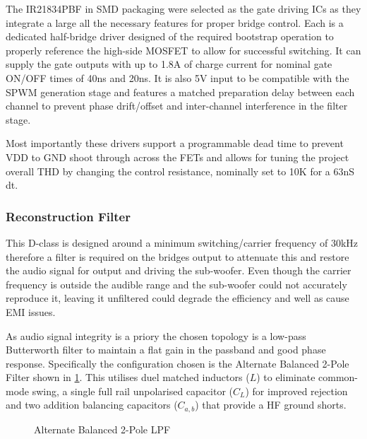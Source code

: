 \documentclass[11pt]{article}
\begin{document}
{The IR21834PBF in SMD packaging were selected as the gate driving ICs as they integrate a large all the necessary features for proper bridge control. Each is a dedicated half-bridge driver designed of the required bootstrap operation to properly reference the high-side MOSFET to allow for successful switching. It can supply the gate outputs with up to 1.8A of charge current for nominal gate ON/OFF times of 40ns and 20ns. It is also 5V input to be compatible with the SPWM generation stage and features a matched preparation delay between each channel to prevent phase drift/offset and inter-channel interference in the filter stage.  

Most importantly these drivers support a programmable dead time to prevent VDD to GND shoot through across the FETs and allows for tuning the project overall THD by changing the control resistance, nominally set to 10K for a 63nS dt.

\subsubsection*{Reconstruction Filter}

This D-class is designed around a minimum switching/carrier frequency of 30kHz therefore a filter is required on the bridges output to attenuate this and restore the audio signal for output and driving the sub-woofer. Even though the carrier frequency is outside the audible range and the sub-woofer could not accurately reproduce it, leaving it unfiltered could degrade the efficiency and well as cause EMI issues.

As audio signal integrity is a priory the chosen topology is a low-pass Butterworth filter to maintain a flat gain in the passband and good phase response.
Specifically the configuration chosen is the Alternate Balanced 2-Pole Filter shown in \cref{F:opf_schem}. This utilises duel matched inductors ($L$) to eliminate common-mode swing, a single full rail unpolarised capacitor ($C_L$) for improved rejection and two addition balancing capacitors ($C_{a,b}$) that provide a HF ground shorts.

\begin{figure}[h!]
  \centering
  \caption{Alternate Balanced 2-Pole LPF}
  \label{F:opf_schem}
\end{figure}

}
\end{document}
